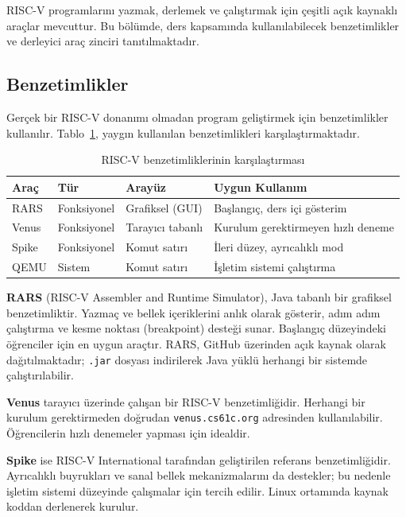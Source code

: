 RISC-V programlarını yazmak, derlemek ve çalıştırmak için çeşitli açık kaynaklı araçlar mevcuttur. Bu bölümde, ders kapsamında kullanılabilecek benzetimlikler ve derleyici araç zinciri tanıtılmaktadır.

\subsection{Benzetimlikler}
\label{sec:ekd-simulatorler}

Gerçek bir RISC-V donanımı olmadan program geliştirmek için benzetimlikler kullanılır. Tablo~\ref{tab:ekd-simulatorler}, yaygın kullanılan benzetimlikleri karşılaştırmaktadır.

\begin{table}[H]
\centering
\caption[RISC-V benzetimliklerinin karşılaştırması]{RISC-V benzetimliklerinin karşılaştırması}
\label{tab:ekd-simulatorler}
\begin{tabular}{@{}llll@{}}
\toprule
\textbf{Araç} & \textbf{Tür} & \textbf{Arayüz} & \textbf{Uygun Kullanım} \\
\midrule
RARS   & Fonksiyonel & Grafiksel (GUI)       & Başlangıç, ders içi gösterim \\
Venus  & Fonksiyonel & Tarayıcı tabanlı      & Kurulum gerektirmeyen hızlı deneme \\
Spike  & Fonksiyonel & Komut satırı          & İleri düzey, ayrıcalıklı mod \\
QEMU   & Sistem      & Komut satırı          & İşletim sistemi çalıştırma \\
\bottomrule
\end{tabular}
\end{table}

\textbf{RARS} (RISC-V Assembler and Runtime Simulator), Java tabanlı bir grafiksel benzetimliktir. Yazmaç ve bellek içeriklerini anlık olarak gösterir, adım adım çalıştırma ve kesme noktası (breakpoint) desteği sunar. Başlangıç düzeyindeki öğrenciler için en uygun araçtır. RARS, GitHub üzerinden açık kaynak olarak dağıtılmaktadır; \texttt{.jar} dosyası indirilerek Java yüklü herhangi bir sistemde çalıştırılabilir.

\textbf{Venus} tarayıcı üzerinde çalışan bir RISC-V benzetimliğidir. Herhangi bir kurulum gerektirmeden doğrudan \texttt{venus.cs61c.org} adresinden kullanılabilir. Öğrencilerin hızlı denemeler yapması için idealdir.

\textbf{Spike} ise RISC-V International tarafından geliştirilen referans benzetimliğidir. Ayrıcalıklı buyrukları ve sanal bellek mekanizmalarını da destekler; bu nedenle işletim sistemi düzeyinde çalışmalar için tercih edilir. Linux ortamında kaynak koddan derlenerek kurulur.

